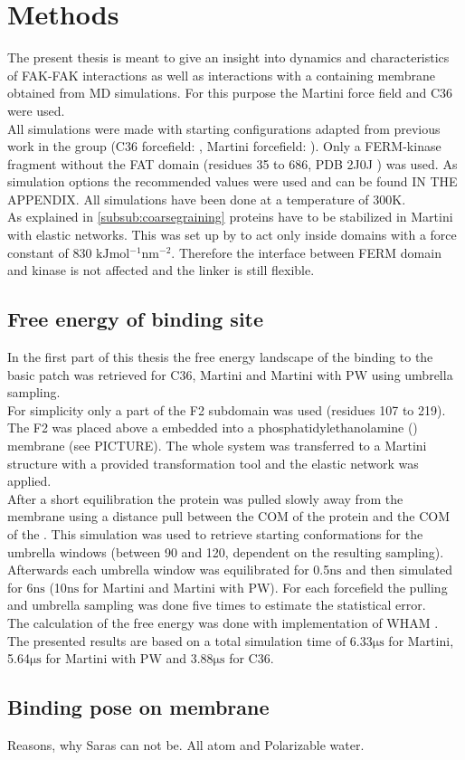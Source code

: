 \section{Methods}
The present thesis is meant to give an insight into dynamics and characteristics of FAK-FAK interactions as well as interactions with a \pip{} containing membrane obtained from MD simulations. For this purpose the Martini force field and C36 were used.\\
All simulations were made with starting configurations adapted from previous work in the group (C36 forcefield: \textcite{pap003}, Martini forcefield: \textcite{SARA}). Only a FERM-kinase fragment without the FAT domain (residues 35 to 686, PDB 2J0J \autocite{structFAK}) was used. As simulation options the recommended values were used and can be found IN THE APPENDIX. All simulations have been done at a temperature of 300$\si{\kelvin}$.\\
As explained in \autoref{subsub:coarsegraining} proteins have to be stabilized in Martini with elastic networks. This was set up by \textcite{SARA} to act only inside domains with a force constant of 830 $\si{\kilo\joule\mole^{-1}\nano\meter^{-2}}$. Therefore the interface between FERM domain and kinase is not affected and the linker is still flexible.
\subsection{Free energy of \pip{} binding site}
In the first part of this thesis the free energy landscape of the \pip{} binding to the basic patch was retrieved for C36, Martini and Martini with PW using umbrella sampling.\\
For simplicity only a part of the F2 subdomain was used (residues 107 to 219). The F2 was placed above a \pip{} embedded into a phosphatidylethanolamine (\pope{}) membrane (see PICTURE). The whole system was transferred to a Martini structure with a provided transformation tool \autocite{backwardpy} and the elastic network was applied.\\
After a short equilibration the protein was pulled slowly away from the membrane using a distance pull between the COM of the protein and the COM of the \pip{}. This simulation was used to retrieve starting conformations for the umbrella windows (between 90 and 120, dependent on the resulting sampling). Afterwards each umbrella window was equilibrated for 0.5$\si{\nano\second}$ and then simulated for 6$\si{\nano\second}$ (10$\si{\nano\second}$ for Martini and Martini with PW). For each forcefield the pulling and umbrella sampling was done five times to estimate the statistical error.\\
The calculation of the free energy was done with \gromacs{} implementation of WHAM \autocite{gromacsWHAMpaper}.
The presented results are based on a total simulation time of 6.33$\si{\micro\second}$ for Martini, 5.64$\si{\micro\second}$ for Martini with PW and 3.88$\si{\micro\second}$ for C36. %
\subsection{Binding pose on membrane}

Reasons, why Saras can not be.
All atom and Polarizable water.
